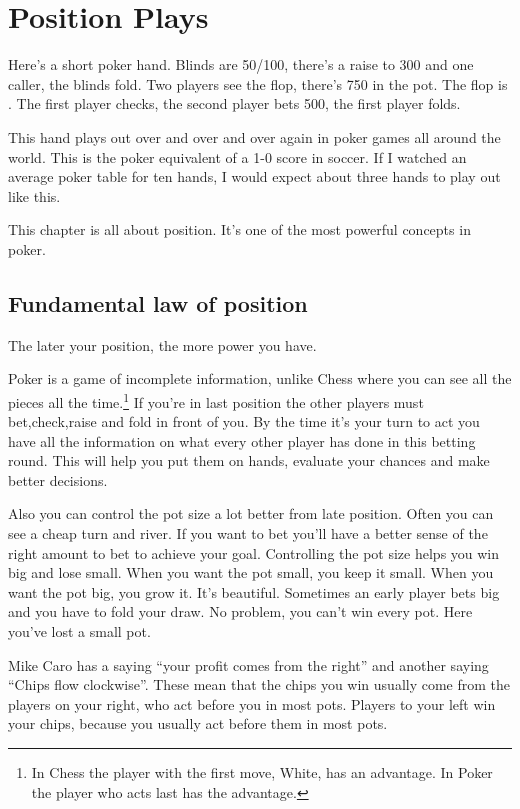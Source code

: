 \chapter{Position Plays}


Here's a short poker hand.
Blinds are 50/100, there's a raise to 300 and one caller, the blinds fold.
Two players see the flop, there's 750 in the pot. The flop is \Qh\sevs\fivec.
The first player checks, the second player bets 500, the first player folds.

This hand plays out over and over and over again in poker games all
around the world. This is the poker equivalent of a 1-0 score in soccer.
If I watched an average poker table for ten hands, I would expect
about three hands to play out like this.

This chapter is all about position. It's one of the
most powerful concepts in poker.

\section{Fundamental law of position}

The later your position, the more power you have.

Poker is a game of incomplete information, unlike Chess where you
can see all the pieces all the time.\footnote{In Chess the player
with the first move, White, has an advantage. In Poker the player
who acts last has the advantage.} If you're in last position
the other players must bet,check,raise and fold in front of you. By
the time it's your turn to act you have all the information on
what every other player has done in this betting round. This will help you
put them on hands, evaluate your chances and make better decisions.

Also you can control the pot size a lot better from late position.
Often you can see a cheap turn and river. If you want to bet
you'll have a better sense of the right amount to bet to achieve
your goal. Controlling the pot size helps you win big and lose small.
When you want the pot small, you keep it small. When you want the pot
big, you grow it. It's beautiful. Sometimes an early player
bets big and you have to fold your draw. No problem,
you can't win every pot. Here you've lost a small pot.

Mike Caro has a saying ``your profit comes from the right'' and another
saying ``Chips flow clockwise''. These mean
that the chips you win usually come from the players on your right,
who act before you in most pots. Players to your left win
your chips, because you usually act before them in most pots.

